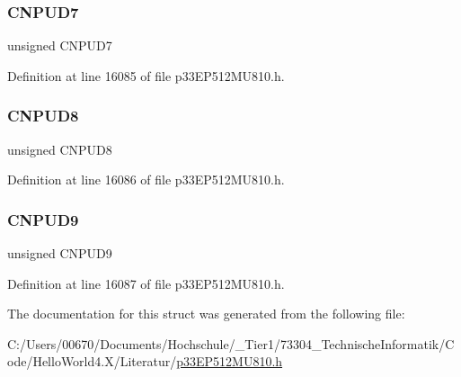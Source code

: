 \subsubsection{\texorpdfstring{C\+N\+P\+U\+D7}{CNPUD7}}
{\footnotesize\ttfamily unsigned C\+N\+P\+U\+D7}



Definition at line 16085 of file p33\+E\+P512\+M\+U810.\+h.

\mbox{\label{structtag_c_n_p_u_d_b_i_t_s_ae108bb505376e30f03c80b34546b039c}} 
\subsubsection{\texorpdfstring{C\+N\+P\+U\+D8}{CNPUD8}}
{\footnotesize\ttfamily unsigned C\+N\+P\+U\+D8}



Definition at line 16086 of file p33\+E\+P512\+M\+U810.\+h.

\mbox{\label{structtag_c_n_p_u_d_b_i_t_s_a4864a5f617124ba0e516125d2cc962e3}} 
\subsubsection{\texorpdfstring{C\+N\+P\+U\+D9}{CNPUD9}}
{\footnotesize\ttfamily unsigned C\+N\+P\+U\+D9}



Definition at line 16087 of file p33\+E\+P512\+M\+U810.\+h.



The documentation for this struct was generated from the following file\+:\begin{DoxyCompactItemize}
\item 
C\+:/\+Users/00670/\+Documents/\+Hochschule/\+\_\+\+Tier1/73304\+\_\+\+Technische\+Informatik/\+Code/\+Hello\+World4.\+X/\+Literatur/\hyperlink{p33_e_p512_m_u810_8h}{p33\+E\+P512\+M\+U810.\+h}\end{DoxyCompactItemize}

